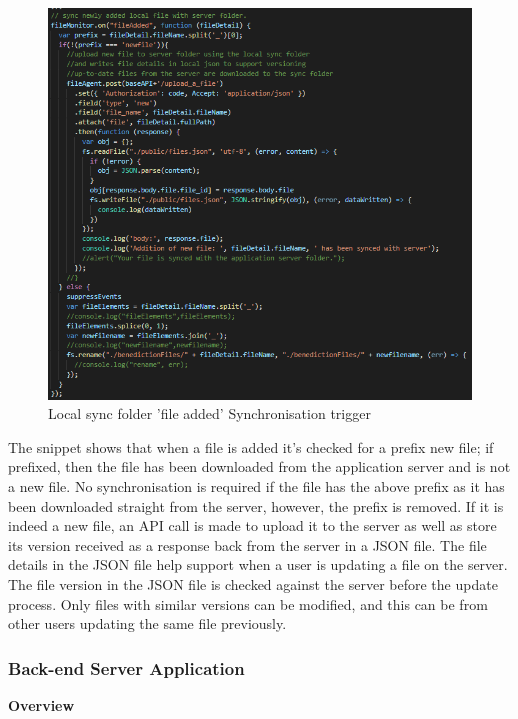 \documentclass{article}
\begin{document}
\begin{figure}[H]
\begin{center}
\includegraphics[width=15cm]{fileAdded.PNG}
\end{center}
\caption{Local sync folder 'file added' Synchronisation trigger}\label{ex4}
\end{figure}

The snippet shows that when a file is added it's checked for a prefix new file; if prefixed, then the file has been downloaded from the application server and is not a new file. No synchronisation is required if the file has the above prefix as it has been downloaded straight from the server, however, the prefix is removed. 
If it is indeed a new file, an API call is made to upload it to the server as well as store its version received as a response back from the server in a JSON file. The file details in the JSON file help support when a user is updating a file on the server. The file version in the JSON file is checked against the server before the update process. Only files with similar versions can be modified, and this can be from other users updating the same file previously. 


\subsubsection{Back-end Server Application}
\item\textbf{Overview}
\end{document}
